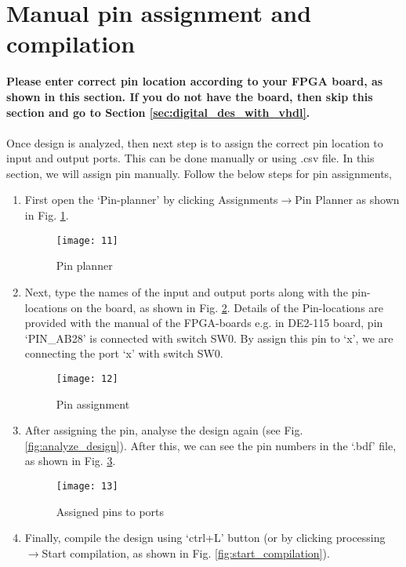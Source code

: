 \section{Manual pin assignment and compilation} \label{sec:compile}
\textbf{Please enter correct pin location according to your FPGA board, as shown in this section. If you do not have the board, then skip this section and go to Section \ref{sec:digital_des_with_vhdl}.}
\\
\\	
Once design is analyzed, then next step is to assign the correct pin location to input and output ports. This can be done manually or using .csv file. In this section, we will assign pin manually. Follow the below steps for pin assignments, 

\begin{enumerate}
	\item First open the `Pin-planner' by clicking Assignments$\rightarrow$Pin Planner as shown in Fig. \ref{fig:pin_planner}.
	
	\begin{figure}
		\centering
		\texttt{[image: 11]}
		\caption{Pin planner}
		\label{fig:pin_planner}
	\end{figure}
	
	\item Next, type the names of the input and output ports along with the pin-locations on the board, as shown in Fig. \ref{fig:pin_assgn}. Details of the Pin-locations are provided with the manual of the FPGA-boards e.g. in DE2-115 board, pin `PIN\_AB28' is connected with switch SW0. By assign this pin to `x', we are connecting the port `x' with switch SW0.
	
	\begin{figure}
		\centering
		\texttt{[image: 12]}
		\caption{Pin assignment}
		\label{fig:pin_assgn}
	\end{figure}
	
	\item After assigning the pin, analyse the design again (see Fig. \ref{fig:analyze_design}). After this, we can see the pin numbers in the `.bdf' file, as shown in Fig. \ref{fig:display_pin_assgn}.
	
	\begin{figure}
		\centering
		\texttt{[image: 13]}
		\caption{Assigned pins to ports}
		\label{fig:display_pin_assgn}
	\end{figure}
	
	\item Finally, compile the design using `ctrl+L' button (or by clicking processing$\rightarrow$Start compilation, as shown in Fig. \ref{fig:start_compilation}). 
	

\end{enumerate}

